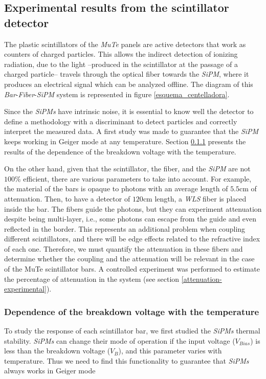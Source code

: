 \documentclass[submitting]{nst}
\begin{document}
\subsection{Experimental results from the scintillator detector}
\label{sec:bar-data}%
The plastic scintillators of the \textsl{MuTe} panels are active detectors that work as counters of charged particles. This allows the indirect detection of ionizing radiation, due to the light --produced in the scintillator at the passage of a charged particle-- travels through the optical fiber towards the \textsl{SiPM}, where it produces an electrical signal which can be analyzed offline. The diagram of this \textsl{Bar}-\textsl{Fiber}-\textsl{SiPM} system is represented in figure \ref{esquema_centelladora}. 

Since the \textsl{SiPMs} have intrinsic noise,  it is essential to know well the detector to define a methodology with a discriminant to detect particles and correctly interpret the measured data. A first study was made to guarantee that the \textsl{SiPM} keeps working in Geiger mode at any temperature. Section \ref{breakdown-voltage} presents the results of the dependence of the breakdown voltage with the temperature.

On the other hand, given that the scintillator, the fiber, and the \textsl{SiPM} are not $100$\% efficient, there are various parameters to take into account. For example, the material of the bars is opaque to photons with an average length of $5.5$cm of attenuation. Then, to have a detector of $120$cm length, a \textsl{WLS} fiber is placed inside the bar. The fibers guide the photons, but they can experiment attenuation despite being multi-layer, i.e., some photons can escape from the guide and even reflected in the border. This represents an additional problem when coupling different scintillators, and there will be edge effects related to the refractive index of each one. Therefore, we must quantify the attenuation in these fibers and determine whether the coupling and the attenuation will be relevant in the case of the MuTe scintillator bars. A controlled experiment was performed to estimate the percentage of attenuation in the system (see section \ref{attenuation-experimental}).

\subsubsection{Dependence of the breakdown voltage with the temperature}
\label{breakdown-voltage}
To study the response of each scintillator bar, we first studied the \textsl{SiPMs} thermal stability. \textsl{SiPMs} can change their mode of operation if the input voltage ($V_{Bias}$) is less than the breakdown voltage ($V_B$), and this parameter varies with temperature. Thus we need to find this functionality to guarantee that \textsl{SiPMs} always works in Geiger mode 
\end{document}
